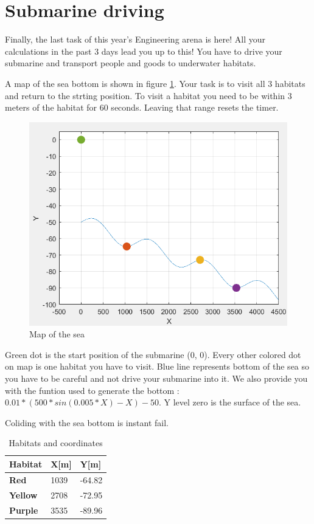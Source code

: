 \documentclass[openany]{book}
\begin{document}
	
\section{Submarine driving}

Finally, the last task of this year's Engineering arena is here! All your calculations in the past 3 days lead you up to this! You have to drive your submarine and transport people and goods to underwater habitats.

A map of the sea bottom is shown in figure \ref{fig:map}. Your task is to visit all 3 habitats and return to the strting position. To visit a habitat you need to be within 3 meters of the habitat for 60 seconds.
Leaving that range resets the timer.

\begin{figure}[!htb]
	\centering
	\includegraphics{Images/path.PNG}
	\caption{Map of the sea}
	\label{fig:map}
\end{figure}

Green dot is the start position of the submarine (0, 0). Every other colored dot on map is one habitat you have to visit. Blue line represents bottom of the sea so you have to be careful and not drive your submarine into it. We also provide you with the funtion used to generate the bottom : $0.01*(500*sin(0.005*X)-X) - 50$. Y level zero is the surface of the sea. 

Coliding with the sea bottom is instant fail.

\begin{table}[h!]
	\caption{Habitats and coordinates}
	\label{tab:nominalValues}
	\begin{tabularx}{\textwidth}{|Y|Y|Y|} \hline
		\textbf{Habitat} & X[m] & Y[m] \\ \hline 
		\textbf{Red} & 1039   & -64.82\\ \hline 
		\textbf{Yellow} & 2708  & -72.95\\ \hline
		\textbf{Purple} & 3535  &  -89.96\\ \hline
	\end{tabularx}
\end{table}
\end{document}
